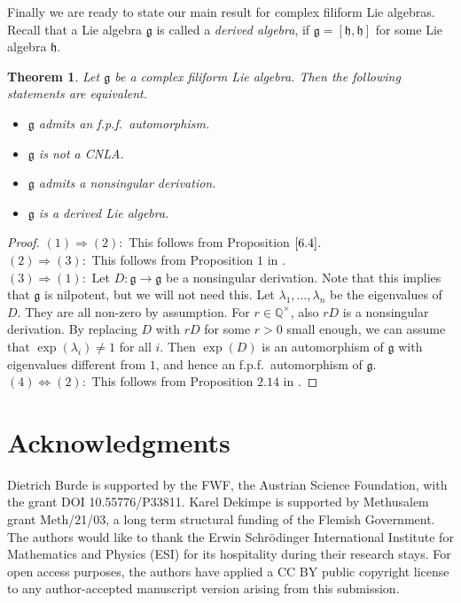 \documentclass[12pt]{amsart}
\newtheorem{thm}{Theorem}[section]
\theoremstyle{definition}
\theoremstyle{remark}
\newcommand{\Q}{\mathbb{Q}}
\newcommand{\Lg}{\mathfrak{g}}
\newcommand{\Lh}{\mathfrak{h}}
\newcommand{\la}{\lambda}
\newcommand{\ra}{\rightarrow}
\begin{document}
Finally we are ready to state our main result for complex filiform Lie algebras.
Recall that a Lie algebra
$\Lg$ is called a {\em derived algebra}, if $\Lg=[\Lh,\Lh]$ for some Lie algebra $\Lh$.

\begin{thm}
Let $\Lg$ be a  complex filiform Lie algebra. Then the following statements are equivalent.
\begin{itemize}
\item[(1)] $\Lg$ admits an f.p.f.\ automorphism.
\item[(2)] $\Lg$ is not a CNLA.
\item[(3)] $\Lg$ admits a nonsingular derivation.
\item[(4)] $\Lg$ is a derived Lie algebra. 
\end{itemize}
\end{thm}  

\begin{proof}
$(1)\Rightarrow (2):$ This follows from Proposition $\ref{6.4}$. \\[0.2cm]
$(2)\Rightarrow (3):$ This follows from Proposition $1$ in \cite{GVE}. \\[0.2cm]
$(3)\Rightarrow (1):$ Let $D\colon \Lg\ra \Lg$ be a nonsingular derivation. Note that this implies that
$\Lg$ is nilpotent, but we will not need this. Let $\la_1,\ldots ,\la_n$ be the eigenvalues of $D$. They are
all non-zero by assumption. For $r\in \Q^{\times}$, also $rD$ is a nonsingular derivation. By replacing $D$
with $rD$ for some $r>0$ small enough, we can assume that $\exp(\la_i)\neq 1$ for all $i$. Then
$\exp(D)$ is an automorphism of $\Lg$ with eigenvalues different from $1$, and hence an f.p.f.\ automorphism
of $\Lg$.  \\[0.2cm]
$(4)\Leftrightarrow (2):$ This follows from Proposition $2.14$ in \cite{SIT}. 
\end{proof}  





\section*{Acknowledgments}
Dietrich Burde is supported by the FWF, the Austrian Science Foun\-da\-tion, with the 
grant DOI 10.55776/P33811. 
Karel Dekimpe is supported by Methusalem grant Meth/21/03, a long term structural funding of the Flemish Government.
The authors would like to thank the Erwin Schrödinger International Institute for Mathematics and Physics (ESI)
for its hospitality during their research stays.
For open access purposes, the authors have applied a CC BY public copyright license to any author-accepted manuscript
version arising from this submission.
\end{document}
